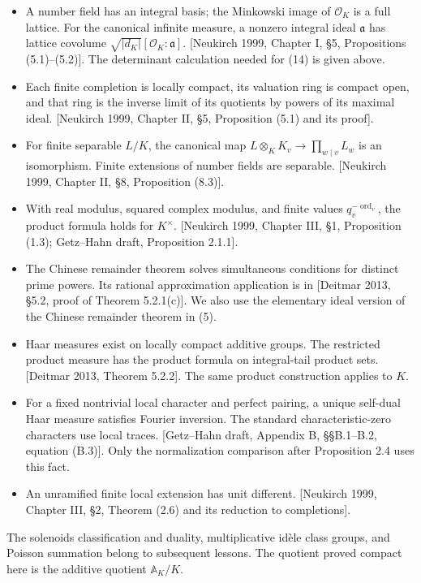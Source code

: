\documentclass[
  english,
  11pt,
  a4paper,
]{article}
\providecommand{\tightlist}{%
  \setlength{\itemsep}{0pt}\setlength{\parskip}{0pt}}
\begin{document}
\begin{itemize}
\tightlist
\item
  A number field has an integral basis; the Minkowski image of
  \(\mathcal O_K\) is a full lattice. For the canonical infinite
  measure, a nonzero integral ideal \(\mathfrak a\) has lattice covolume
  \(\sqrt{|d_K|}[\mathcal O_K:\mathfrak a]\). {[}Neukirch 1999, Chapter
  I, §5, Propositions (5.1)--(5.2){]}. The determinant calculation
  needed for (14) is given above.
\item
  Each finite completion is locally compact, its valuation ring is
  compact open, and that ring is the inverse limit of its quotients by
  powers of its maximal ideal. {[}Neukirch 1999, Chapter II, §5,
  Proposition (5.1) and its proof{]}.
\item
  For finite separable \(L/K\), the canonical map
  \(L\otimes_K K_v\to\prod_{w\mid v}L_w\) is an isomorphism. Finite
  extensions of number fields are separable. {[}Neukirch 1999, Chapter
  II, §8, Proposition (8.3){]}.
\item
  With real modulus, squared complex modulus, and finite values
  \(q_v^{-\operatorname{ord}_v}\), the product formula holds for
  \(K^\times\). {[}Neukirch 1999, Chapter III, §1, Proposition (1.3);
  Getz--Hahn draft, Proposition 2.1.1{]}.
\item
  The Chinese remainder theorem solves simultaneous conditions for
  distinct prime powers. Its rational approximation application is in
  {[}Deitmar 2013, §5.2, proof of Theorem 5.2.1(c){]}. We also use the
  elementary ideal version of the Chinese remainder theorem in (5).
\item
  Haar measures exist on locally compact additive groups. The restricted
  product measure has the product formula on integral-tail product sets.
  {[}Deitmar 2013, Theorem 5.2.2{]}. The same product construction
  applies to \(K\).
\item
  For a fixed nontrivial local character and perfect pairing, a unique
  self-dual Haar measure satisfies Fourier inversion. The standard
  characteristic-zero characters use local traces. {[}Getz--Hahn draft,
  Appendix B, §§B.1--B.2, equation (B.3){]}. Only the normalization
  comparison after Proposition 2.4 uses this fact.
\item
  An unramified finite local extension has unit different. {[}Neukirch
  1999, Chapter III, §2, Theorem (2.6) and its reduction to
  completions{]}.
\end{itemize}

The solenoid\textquotesingle s classification and duality,
multiplicative idèle class groups, and Poisson summation belong to
subsequent lessons. The quotient proved compact here is the additive
quotient \(\mathbb A_K/K\).
\end{document}

